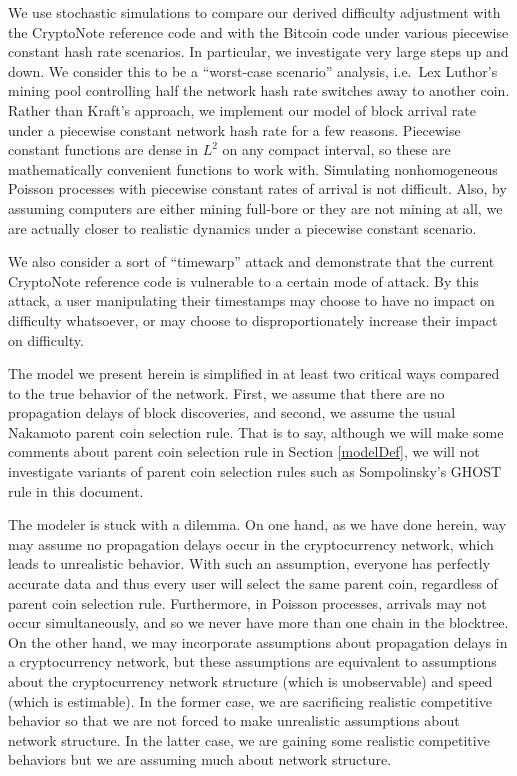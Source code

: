 \documentclass[12pt,english]{mrl}
\theoremstyle{definition}
\numberwithin{equation}{section}
\numberwithin{figure}{section}
\numberwithin{equation}{section}
\numberwithin{equation}{section}
\numberwithin{figure}{section}
\begin{document}
We use stochastic simulations to compare our derived difficulty adjustment with the CryptoNote reference code and with the Bitcoin code under various piecewise constant hash rate scenarios. In particular, we investigate very large steps up and down. We consider this to be a ``worst-case scenario'' analysis, i.e.\ Lex Luthor's mining pool controlling half the network hash rate switches away to another coin.  
Rather than Kraft's approach, we implement our model of block arrival rate under a piecewise constant network hash rate for a few reasons. Piecewise constant functions are dense in $L^2$ on any compact interval, so these are mathematically convenient functions to work with. Simulating nonhomogeneous Poisson processes with piecewise constant rates of arrival is not difficult. Also, by assuming computers are either mining full-bore or they are not mining at all, we are actually closer to realistic dynamics under a piecewise constant scenario.

We also consider a sort of ``timewarp'' attack and demonstrate that the current CryptoNote reference code is vulnerable to a certain mode of attack. By this attack, a user manipulating their timestamps may choose to have no impact on difficulty whatsoever, or may choose to disproportionately increase their impact on difficulty.

The model we present herein is simplified in at least two critical ways compared to the true behavior of the network. First, we assume that there are no propagation delays of block discoveries, and second, we assume the usual Nakamoto parent coin selection rule. That is to say, although we will make some comments about parent coin selection rule in Section \ref{modelDef}, we will not investigate variants of parent coin selection rules such as Sompolinsky's GHOST rule in this document.

The modeler is stuck with a dilemma. On one hand, as we have done herein, way may assume no propagation delays occur in the cryptocurrency network, which leads to unrealistic behavior. With such an assumption, everyone has perfectly accurate data and thus every user will select the same parent coin, regardless of parent coin selection rule. Furthermore, in Poisson processes, arrivals may not occur simultaneously, and so we never have more than one chain in the blocktree. On the other hand, we may incorporate assumptions about propagation delays in a cryptocurrency network, but these assumptions are equivalent to assumptions about the cryptocurrency network structure (which is unobservable) and speed (which is estimable). In the former case, we are sacrificing realistic competitive behavior so that we are not forced to make unrealistic assumptions about network structure. In the latter case, we are gaining some realistic competitive behaviors but we are assuming much about network structure. 
\end{document}
